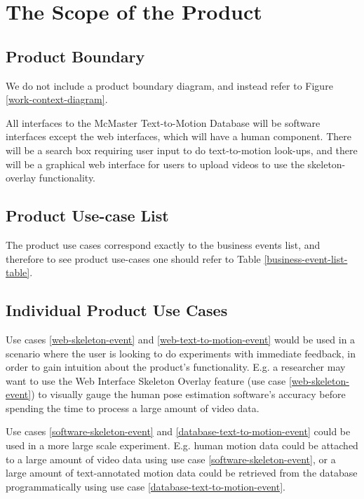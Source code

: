 \documentclass{scrreprt}
\begin{document}
\section{The Scope of the Product}

\subsection{Product Boundary}

We do not include a product boundary diagram, and instead refer to Figure
\ref{work-context-diagram}.

All interfaces to the McMaster Text-to-Motion Database will be software
interfaces except the web interfaces, which will have a human component. There
will be a search box requiring user input to do text-to-motion look-ups, and
there will be a graphical web interface for users to upload videos to use the
skeleton-overlay functionality.

\subsection{Product Use-case List}

The product use cases correspond exactly to the business events list, and
therefore to see product use-cases one should refer to Table
\ref{business-event-list-table}.

\subsection{Individual Product Use Cases}

Use cases \ref{web-skeleton-event} and \ref{web-text-to-motion-event} would be
used in a scenario where the user is looking to do experiments with immediate
feedback, in order to gain intuition about the product's functionality. E.g. a
researcher may want to use the Web Interface Skeleton Overlay feature (use case
\ref{web-skeleton-event}) to visually gauge the human pose estimation
software's accuracy before spending the time to process a large amount of video
data.

Use cases \ref{software-skeleton-event} and \ref{database-text-to-motion-event}
could be used in a more large scale experiment. E.g. human motion data could be
attached to a large amount of video data using use case
\ref{software-skeleton-event}, or a large amount of text-annotated motion data
could be retrieved from the database programmatically using use case
\ref{database-text-to-motion-event}.
\end{document}

